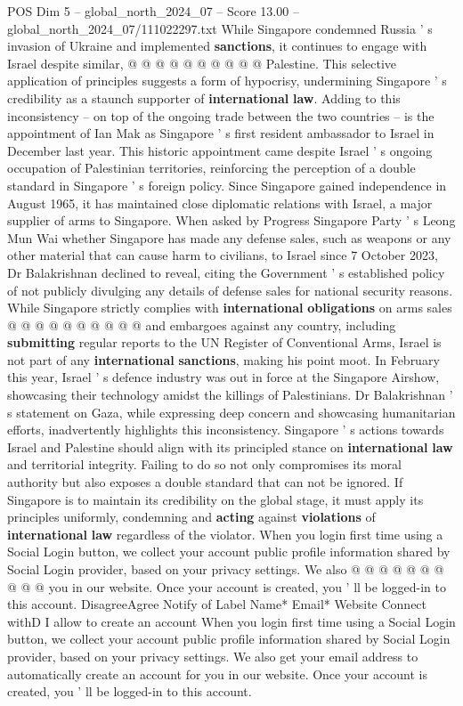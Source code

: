 \begin{textsample}{POS Dim 5 – global\_north\_2024\_07 – Score 13.00 – global\_north\_2024\_07/111022297.txt}
While Singapore condemned Russia ' s invasion of Ukraine and implemented \textbf{sanctions}, it continues to engage with Israel despite similar, @ @ @ @ @ @ @ @ @ @ Palestine.
This selective application of principles suggests a form of hypocrisy, undermining Singapore ' s credibility as a staunch supporter of \textbf{international} \textbf{law}.
Adding to this inconsistency -- on top of the ongoing trade between the two countries -- is the appointment of Ian Mak as Singapore ' s first resident ambassador to Israel in December last year.
This historic appointment came despite Israel ' s ongoing occupation of Palestinian territories, reinforcing the perception of a double standard in Singapore ' s foreign policy.
Since Singapore gained independence in August 1965, it has maintained close diplomatic relations with Israel, a major supplier of arms to Singapore.
When asked by Progress Singapore Party ' s Leong Mun Wai whether Singapore has made any defense sales, such as weapons or any other material that can cause harm to civilians, to Israel since 7 October 2023, Dr Balakrishnan declined to reveal, citing the Government ' s established policy of not publicly divulging any details of defense sales for national security reasons.
While Singapore strictly complies with \textbf{international} \textbf{obligations} on arms sales @ @ @ @ @ @ @ @ @ @ and embargoes against any country, including \textbf{submitting} regular reports to the UN Register of Conventional Arms, Israel is not part of any \textbf{international} \textbf{sanctions}, making his point moot.
In February this year, Israel ' s defence industry was out in force at the Singapore Airshow, showcasing their technology amidst the killings of Palestinians.
Dr Balakrishnan ' s statement on Gaza, while expressing deep concern and showcasing humanitarian efforts, inadvertently highlights this inconsistency.
Singapore ' s actions towards Israel and Palestine should align with its principled stance on \textbf{international} \textbf{law} and territorial integrity.
Failing to do so not only compromises its moral authority but also exposes a double standard that can not be ignored.
If Singapore is to maintain its credibility on the global stage, it must apply its principles uniformly, condemning and \textbf{acting} against \textbf{violations} of \textbf{international} \textbf{law} regardless of the violator.
When you login first time using a Social Login button, we collect your account public profile information shared by Social Login provider, based on your privacy settings.
We also @ @ @ @ @ @ @ @ @ @ you in our website.
Once your account is created, you ' ll be logged-in to this account.
DisagreeAgree Notify of Label Name* Email* Website Connect withD I allow to create an account When you login first time using a Social Login button, we collect your account public profile information shared by Social Login provider, based on your privacy settings.
We also get your email address to automatically create an account for you in our website.
Once your account is created, you ' ll be logged-in to this account.


\end{textsample}
